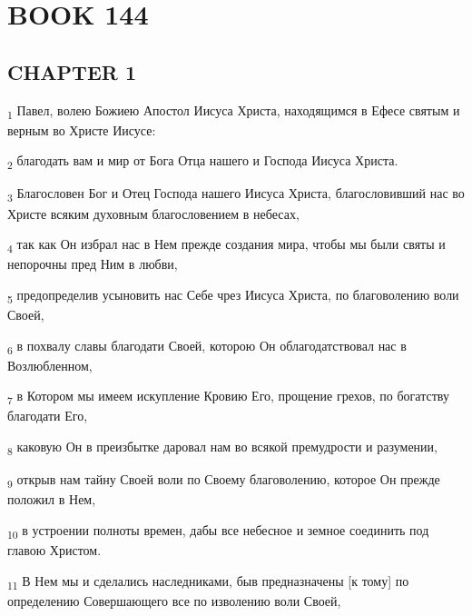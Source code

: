 \section{BOOK 144}
\subsection{CHAPTER 1}
\begin{tcolorbox}
\textsubscript{1} Павел, волею Божиею Апостол Иисуса Христа, находящимся в Ефесе святым и верным во Христе Иисусе:
\end{tcolorbox}
\begin{tcolorbox}
\textsubscript{2} благодать вам и мир от Бога Отца нашего и Господа Иисуса Христа.
\end{tcolorbox}
\begin{tcolorbox}
\textsubscript{3} Благословен Бог и Отец Господа нашего Иисуса Христа, благословивший нас во Христе всяким духовным благословением в небесах,
\end{tcolorbox}
\begin{tcolorbox}
\textsubscript{4} так как Он избрал нас в Нем прежде создания мира, чтобы мы были святы и непорочны пред Ним в любви,
\end{tcolorbox}
\begin{tcolorbox}
\textsubscript{5} предопределив усыновить нас Себе чрез Иисуса Христа, по благоволению воли Своей,
\end{tcolorbox}
\begin{tcolorbox}
\textsubscript{6} в похвалу славы благодати Своей, которою Он облагодатствовал нас в Возлюбленном,
\end{tcolorbox}
\begin{tcolorbox}
\textsubscript{7} в Котором мы имеем искупление Кровию Его, прощение грехов, по богатству благодати Его,
\end{tcolorbox}
\begin{tcolorbox}
\textsubscript{8} каковую Он в преизбытке даровал нам во всякой премудрости и разумении,
\end{tcolorbox}
\begin{tcolorbox}
\textsubscript{9} открыв нам тайну Своей воли по Своему благоволению, которое Он прежде положил в Нем,
\end{tcolorbox}
\begin{tcolorbox}
\textsubscript{10} в устроении полноты времен, дабы все небесное и земное соединить под главою Христом.
\end{tcolorbox}
\begin{tcolorbox}
\textsubscript{11} В Нем мы и сделались наследниками, быв предназначены [к тому] по определению Совершающего все по изволению воли Своей,
\end{tcolorbox}
